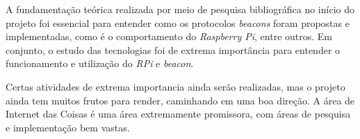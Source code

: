 \documentclass[
		12pt,				%
		openright,			%
		oneside,			%
		a4paper,			%
		chapter=TITLE,		%
		english,			%
		brazil				%
	]{abntex2}
\begin{document}
A fundamentação teórica realizada por meio de pesquisa bibliográfica no início do projeto foi essencial para entender como os protocolos \textit{beacons} foram propostas e implementadas, como é o comportamento do \textit{Raspberry Pi}, entre outros. Em conjunto, o estudo das tecnologias foi de extrema importância para entender o funcionamento e utilização do \textit{RPi} e \textit{beacon}.

Certas atividades de extrema importancia ainda serão realizadas, mas o projeto ainda tem muitos frutos para render, caminhando em uma boa direção. A área de Internet das Coisas é uma área extremamente promissora, com áreas de pesquisa e implementação bem vastas. 









\begin{apendicesenv}



\end{apendicesenv}

\end{document}
